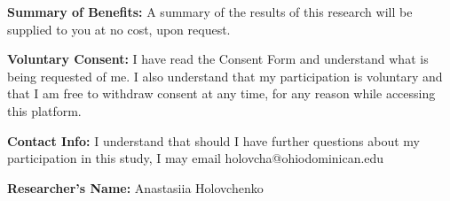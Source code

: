 \documentclass{ximera}
\begin{document}
\textbf{Summary of Benefits:} A summary of the results of this research will be supplied to you at no cost, upon request.  

\textbf{Voluntary Consent:} I have read the Consent Form and understand what is being requested of me.  I also understand that my participation is voluntary and that I am free to withdraw consent at any time, for any reason while accessing this platform.  

\textbf{Contact Info:}  I understand that should I have further questions about my participation in this study, I may email holovcha@ohiodominican.edu

\textbf{Researcher’s Name:} Anastasiia Holovchenko
\end{document}
